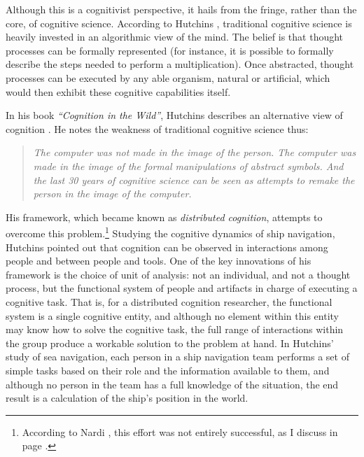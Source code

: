 Although this is a cognitivist perspective, it hails from the fringe, rather than the core, of cognitive science. According to Hutchins , traditional cognitive science is heavily invested in an algorithmic view of the mind. The belief is that thought processes can be formally represented (for instance, it is possible to formally describe the steps needed to perform a multiplication). Once abstracted, thought processes can be executed by any able organism, natural or artificial, which would then exhibit these cognitive capabilities itself.

In his book \emph{``Cognition in the Wild''}, Hutchins describes an alternative view of cognition \cite{Hutchins1995}. He notes the weakness of traditional cognitive science thus:

\begin{quote}
\emph{The computer was not made in the image of the person. The computer was made in the image of the formal manipulations of abstract symbols. And the last 30 years of cognitive science can be seen as attempts to remake the person in the image of the computer.}
\end{quote}

His framework, which became known as \emph{distributed cognition}, attempts to overcome this problem.\footnote{According to Nardi , this effort was not entirely successful, as I discuss in page \pageref{Nardi}.} Studying the cognitive dynamics of ship navigation, Hutchins pointed out that cognition can be observed in interactions among people and between people and tools. One of the key innovations of his framework is the choice of unit of analysis: not an individual, and not a thought process, but the functional system of people and artifacts in charge of executing a cognitive task. That is, for a distributed cognition researcher, the functional system is a single cognitive entity, and although no element within this entity may know how to solve the cognitive task, the full range of interactions within the group produce a workable solution to the problem at hand. In Hutchins' study of sea navigation, each person in a ship navigation team performs a set of simple tasks based on their role and the information available to them, and although no person in the team has a full knowledge of the situation, the end result is a calculation of the ship's position in the world.


